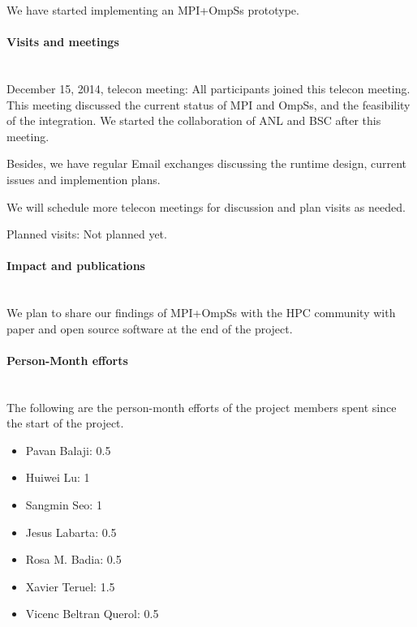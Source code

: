 We have started implementing an MPI+OmpSs prototype.

\paragraph{Visits and meetings}~\\

December 15, 2014, telecon meeting: All participants joined this telecon
meeting.  This meeting discussed the current status of MPI and OmpSs, and the
feasibility of the integration.  We started the collaboration of ANL and BSC
after this meeting.

Besides, we have regular Email exchanges discussing the runtime design, current
issues and implemention plans.

We will schedule more telecon meetings for discussion and plan visits as needed.

Planned visits: Not planned yet.

\paragraph{Impact and publications}~\\


We plan to share our findings of MPI+OmpSs with the HPC community with paper
and open source software at the end of the project.

\paragraph{Person-Month efforts}~\\


The following are the person-month efforts of the project members spent since
the start of the project.
\begin{itemize}
  \item Pavan Balaji: 0.5
  \item Huiwei Lu: 1
  \item Sangmin Seo: 1
  \item Jesus Labarta: 0.5
  \item Rosa M. Badia: 0.5
  \item Xavier Teruel: 1.5
  \item Vicenc Beltran Querol: 0.5
\end{itemize}

